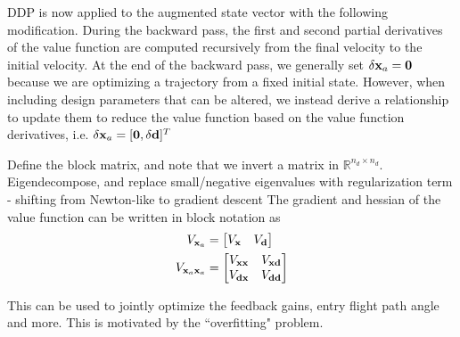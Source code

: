 DDP is now applied to the augmented state vector with the following modification. 
During the backward pass, the first and second partial derivatives of the value function are computed recursively from the final velocity to the initial velocity.
At the end of the backward pass, we generally set $\delta\mathbf{x}_a=\mathbf{0}$ because we are optimizing a trajectory from a fixed initial state. However, when including design parameters that can be altered, we instead derive a relationship to update them to reduce the value function based on the value function derivatives, i.e. $\delta\mathbf{x}_a = [\mathbf{0},\delta\mathbf{d}]^T$

Define the block matrix, and note that we invert a matrix in $\mathbb{R}^{n_d\times n_d}$. Eigendecompose, and replace small/negative eigenvalues with regularization term - shifting from Newton-like to gradient descent 
The gradient and hessian of the value function can be written in block notation as 
\begin{align}
	V_{\mathbf{x}_a} &= \begin{bmatrix}
		V_{\mathbf{x}} & V_{\mathbf{d}}
	\end{bmatrix} \\
	V_{\mathbf{x}_a\mathbf{x}_a} &= \begin{bmatrix}
	V_{\mathbf{x}\mathbf{x}} & V_{\mathbf{x}\mathbf{d}} \\
	V_{\mathbf{d}\mathbf{x}} & V_{\mathbf{d}\mathbf{d}}
\end{bmatrix}
\end{align}

This can be used to jointly optimize the feedback gains, entry flight path angle and more. This is motivated by the ``overfitting" problem. 

